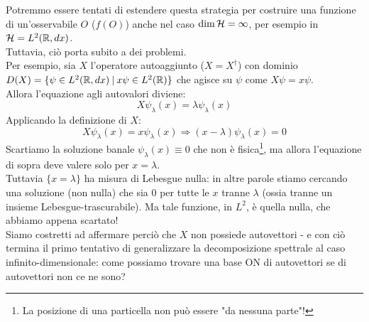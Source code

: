 Potremmo essere tentati di estendere questa strategia per costruire una funzione di un'osservabile $O$ ($f(O)$) anche nel caso $\operatorname{dim}\mathcal{H} = \infty$, per esempio in $\mathcal{H} = L^2(\mathbb{R}, dx)$.\\
Tuttavia, ciò porta subito a dei problemi.\\
Per esempio, sia $X$ l'operatore autoaggiunto ($X=X^\dag$) con dominio $D(X) = \{\psi \in L^2(\mathbb{R}, dx)\>|\>x\psi \in L^2(\mathbb{R})\}$ che agisce su $\psi$ come $X\psi = x\psi$.\\
Allora l'equazione agli autovalori diviene:
\[
X\psi_\lambda (x) = \lambda \psi_\lambda (x)
\]
Applicando la definizione di $X$:
\[
X\psi_\lambda(x) = x\psi_\lambda(x) \Rightarrow (x-\lambda)\psi_\lambda (x) = 0
\]
Scartiamo la soluzione banale $\psi_\lambda(x) \equiv 0$ che non è fisica\footnote{La posizione di una particella non può essere "da nessuna parte"!}, ma allora l'equazione di sopra deve valere solo per $x = \lambda$.\\
Tuttavia $\{x = \lambda \}$ ha misura di Lebesgue nulla: in altre parole stiamo cercando una soluzione (non nulla) che sia $0$ per tutte le $x$ tranne $\lambda$ (ossia tranne un insieme Lebesgue-trascurabile). Ma tale funzione, in $L^2$, è quella nulla, che abbiamo appena scartato!\\
Siamo costretti ad affermare perciò che $X$ non possiede autovettori - e con ciò termina il primo tentativo di generalizzare la decomposizione spettrale al caso infinito-dimensionale: come possiamo trovare una base ON di autovettori se di autovettori non ce ne sono?\\

